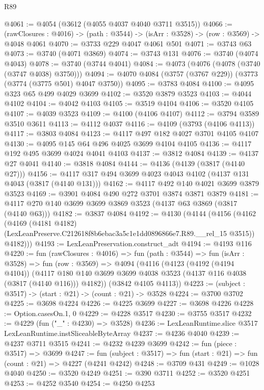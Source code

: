 \begin{lexlean}{R89}
\begin{coremodule}
@4061 := @4054 (@3612 (@4055 @4037 @4040 @3711 @3515))
@4066 := (rawClosures : @4016) -> (path : @3544) -> (isArr : @3528) -> (row : @3569) -> @4048 @4061
@4070 := @3733 @229 @4047 @4061 @501
@4071 := @3743 @63
@4073 := @3740 (@4071 @3869)
@4074 := @3743 @131
@4076 := @3740 (@4074 @4043)
@4078 := @3740 (@3744 @4041)
@4084 := @4073 (@4076 (@4078 (@3740 (@3747 @4038) @3750)))
@4094 := @4070 @4084 (@3757 (@3767 @229)) (@3773 (@3774 (@3775 @501) @4047 @3750))
@4095 := @3783 @4084
@4100 := @4095 @323 @65 @499 @4029 @3699
@4102 := @3520 @3879 @3523
@4103 := @4044 @4102
@4104 := @4042 @4103
@4105 := @3519 @4104
@4106 := @3520 @4105
@4107 := @4039 @3523
@4109 := @4100 (@4106 @4107)
@4112 := @3794 @3589 @3510 @3611
@4113 := @4112 @4037
@4116 := @4109 (@3793 (@4106 @4113))
@4117 := @3803 @4084
@4123 := @4117 @497 @182 @4027 @3701 @4105 @4107
@4130 := @4095 @145 @64 @496 @4025 @3699 @4104 @4105
@4136 := @4117 @192 @495 @3699 @4024 @4041 @4103
@4137 := @3812 @4084
@4139 := @4137 @27 @4041
@4140 := @3818 @4084
@4144 := @4136 (@4139 (@3817 (@4140 @27)))
@4156 := @4117 @317 @494 @3699 @4023 @4043 @4102 (@4137 @131 @4043 (@3817 (@4140 @131)))
@4162 := @4117 @492 @140 @4021 @3699 @3879 @3523
@4169 := @3901 @4084 @490 @272 @3701 @3874 @3871 @3879
@4181 := @4117 @270 @140 @3699 @3699 @3869 @3523 (@4137 @63 @3869 (@3817 (@4140 @63)))
@4182 := @3837 @4084
@4192 := @4130
    (@4144
      (@4156
        (@4162
          (@4169
            (@4181 @4182)
            (LexLeanPreserve.C212618f8b6ebac3a5c1e1dd0896866e7.R89.__rel_15 @3515))
          @4182)))
@4193 := LexLeanPreservation.construct_adt
@4194 := @4193 @116
@4220 := fun (rawClosures : @4016) =>
  fun (path : @3544) =>
  fun (isArr : @3528) =>
  fun (row : @3569) =>
  @4094
    (@4116
      (@4123
        (@4192 (@4194 @4104))
        (@4117 @180 @140 @3699 @3699 @4038 @3523 (@4137 @116 @4038 (@3817 (@4140 @116))) @4182))
      (@3842 @4105 @4113))
@4223 := (subject : @3517) -> (start : @21) -> (count : @21) -> @3528
@4224 := @3700 @3702
@4225 := @3698 @4224
@4226 := @4225 @3699
@4227 := @3698 @4226
@4228 := Option.casesOn.{1, 0}
@4229 := @4228 @3517
@4230 := @3755 @3517
@4232 := @4229 (fun ("_" : @4230) => @3528)
@4236 := LexLeanRuntime.slice @3517 LexLeanRuntime.instSliceableByteArray
@4237 := @4236 @4040
@4239 := @4237 @3711 @3515
@4241 := @4232 @4239 @3699
@4242 := fun (piece : @3517) => @3699
@4247 := fun (subject : @3517) => fun (start : @21) => fun (count : @21) => @4227 (@4241 @4242)
@4248 := @3709 @431
@4249 := @1028 @4040
@4250 := @3520 @4249
@4251 := @390 @3711
@4252 := @3520 @4251
@4253 := @4252 @3540
@4254 := @4250 @4253

\end{coremodule}
\end{lexlean}
